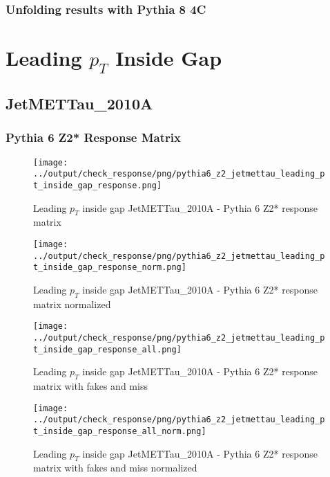 \documentclass[11pt]{book}
\begin{document}
\subsection{Unfolding results with Pythia 8 4C}


\newpage
\chapter{Leading $p_{T}$ Inside Gap}
\section{JetMETTau\_2010A}
\subsection{Pythia 6 Z2* Response Matrix}

\begin{figure}[ht]
\centering
\texttt{[image: ../output/check\_response/png/pythia6\_z2\_jetmettau\_leading\_pt\_inside\_gap\_response.png]}
\caption{Leading $p_{T}$ inside gap JetMETTau\_2010A - Pythia 6 Z2* response matrix}
\label{p6_jetmettau_leading_pt_inside_gap_response}
\end{figure}

\begin{figure}[ht]
\centering
\texttt{[image: ../output/check\_response/png/pythia6\_z2\_jetmettau\_leading\_pt\_inside\_gap\_response\_norm.png]}
\caption{Leading $p_{T}$ inside gap JetMETTau\_2010A - Pythia 6 Z2* response matrix normalized}
\label{p6_jetmettau_leading_pt_inside_gap_response_norm}
\end{figure}

\begin{figure}[ht]
\centering
\texttt{[image: ../output/check\_response/png/pythia6\_z2\_jetmettau\_leading\_pt\_inside\_gap\_response\_all.png]}
\caption{Leading $p_{T}$ inside gap JetMETTau\_2010A - Pythia 6 Z2* response matrix with fakes and miss}
\label{p6_jetmettau_leading_pt_inside_gap_response_all}
\end{figure}

\begin{figure}[ht]
\centering
\texttt{[image: ../output/check\_response/png/pythia6\_z2\_jetmettau\_leading\_pt\_inside\_gap\_response\_all\_norm.png]}
\caption{Leading $p_{T}$ inside gap JetMETTau\_2010A - Pythia 6 Z2* response matrix with fakes and miss normalized}
\label{p6_jetmettau_leading_pt_inside_gap_response_all_norm}
\end{figure}
\end{document}
